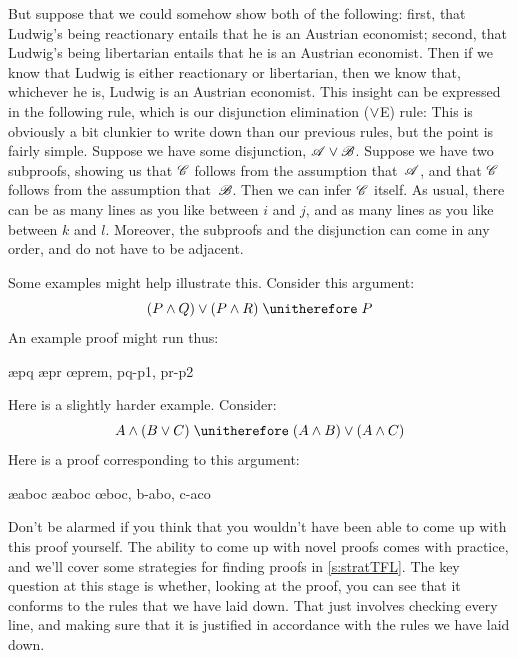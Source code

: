 But suppose that we could somehow show both of the following: first, that Ludwig's being reactionary entails that he is an Austrian economist; second, that Ludwig's being libertarian entails that he is an Austrian economist. Then if we know that Ludwig is either reactionary or libertarian, then we know that, whichever he is, Ludwig is an Austrian economist. This insight can be expressed in the following rule, which is our disjunction elimination ($\vee$E) rule:
This is obviously a bit clunkier to write down than our previous rules, but the point is fairly simple. Suppose we have some disjunction, $\mathscr{A} \vee \mathscr{B}$. Suppose we have two subproofs, showing us that $\mathscr{C}$ follows from the assumption that~$\mathscr{A}$, and that $\mathscr{C}$ follows from the assumption that~$\mathscr{B}$. Then we can infer $\mathscr{C}$ itself. As usual, there can be as many lines as you like between $i$ and $j$, and as many lines as you like between $k$ and $l$. Moreover, the subproofs and the disjunction can come in any order, and do not have to be adjacent.

Some examples might help illustrate this. Consider this argument:
$$(P \eand Q) \eor (P \eand R) \therefore P$$
An example proof might run thus:
	\begin{fitchproof}
		\PR
			\open
				\AS
				\ae{pq}
			\close
			\open
				\AS
				\ae{pr}
			\close
		\oe{prem, pq-p1, pr-p2}
	\end{fitchproof}
Here is a slightly harder example. Consider:
	$$ A \eand (B \eor C) \therefore (A \eand B) \eor (A \eand C)$$
Here is a proof corresponding to this argument:
	\begin{fitchproof}
		\hypo{aboc}{A \eand (B \eor C)}\PR
		\ae{aboc}
		\ae{aboc}
		\open
			\hypo{b}{B}\AS
			\ai{a,b}
			\have{abo}{(A \eand B) \eor (A \eand C)}\oi{ab}
		\close
		\open
			\hypo{c}{C}\AS
			\ai{a,c}
			\have{aco}{(A \eand B) \eor (A \eand C)}\oi{ac}
		\close
	\oe{boc, b-abo, c-aco}
	\end{fitchproof}
Don't be alarmed if you think that you wouldn't have been able to come up with this proof yourself. The ability to come up with novel proofs comes with practice, and we'll cover some strategies for finding proofs in \cref{s:stratTFL}. The key question at this stage is whether, looking at the proof, you can see that it conforms to the rules that we have laid down. That just involves checking every line, and making sure that it is justified in accordance with the rules we have laid down.


